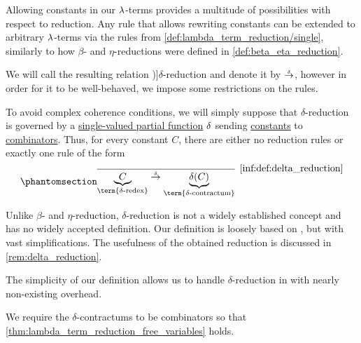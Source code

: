 \begin{definition}\label{def:delta_reduction}
  Allowing constants in our \( {\mathrm \lambda} \)-terms provides a multitude of possibilities with respect to reduction. Any rule that allows rewriting constants can be extended to arbitrary \( {\mathrm \lambda} \)-terms via the rules from \cref{def:lambda_term_reduction/single}, similarly to how \( \beta \)- and \( \eta \)-reductions were defined in \cref{def:beta_eta_reduction}.

  We will call the resulting relation \term[en=\( \delta \)-reduction (\cite[def. 15.3.1]{Barendregt1984LambdaCalculus})]{\( \delta \)-reduction} and denote it by \( {\dred} \), however in order for it to be well-behaved, we impose some restrictions on the rules.

  To avoid complex coherence conditions, we will simply suppose that \( \delta \)-reduction is governed by a \hyperref[def:set_valued_map/partial]{single-valued partial function} \( \op*{\delta} \) sending \hyperref[def:lambda_term/const]{constants} to \hyperref[def:lambda_combinator]{combinators}. Thus, for every constant \( C \), there are either no reduction rules or exactly one rule of the form
  \begin{equation*}\taglabel[\ensuremath{ \logic{Red}_{\delta_C} }]{inf:def:delta_reduction}
    \begin{prooftree}
      \infer0[\ref{inf:def:delta_reduction}]{ \underbrace{C}_{\T{\term{\( \delta \)-redex}}} \dred \underbrace{\op*{\delta}(C)}_{\T{\term{\( \delta \)-contractum}}} }.
    \end{prooftree}
  \end{equation*}
\end{definition}
\begin{comments}
  \item Unlike \( \beta \)- and \( \eta \)-reduction, \( \delta \)-reduction is not a widely established concept and has no widely accepted definition. Our definition is loosely based on , but with vast simplifications. The usefulness of the obtained reduction is discussed in \cref{rem:delta_reduction}.

  The simplicity of our definition allows us to handle \( \delta \)-reduction in  with nearly non-existing overhead.

  \item We require the \( \delta \)-contractums to be combinators so that \cref{thm:lambda_term_reduction_free_variables} holds.
\end{comments}

